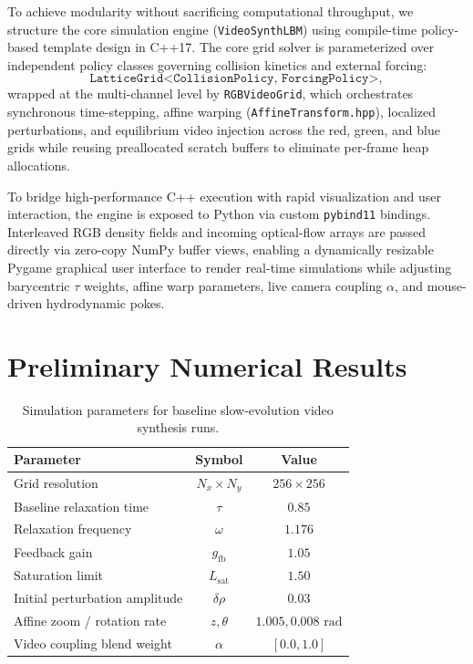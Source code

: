 \documentclass[aps,pre,twocolumn,showpacs,superscriptaddress,floatfix]{revtex4-2}
\begin{document}
To achieve modularity without sacrificing computational throughput, we structure the core simulation engine (\texttt{VideoSynthLBM}) using compile-time policy-based template design in C++17. The core grid solver is parameterized over independent policy classes governing collision kinetics and external forcing:
\begin{equation}
\texttt{LatticeGrid<CollisionPolicy, ForcingPolicy>},
\end{equation}
wrapped at the multi-channel level by \texttt{RGBVideoGrid}, which orchestrates synchronous time-stepping, affine warping (\texttt{AffineTransform.hpp}), localized perturbations, and equilibrium video injection across the red, green, and blue grids while reusing preallocated scratch buffers to eliminate per-frame heap allocations.

To bridge high-performance C++ execution with rapid visualization and user interaction, the engine is exposed to Python via custom \texttt{pybind11} bindings. Interleaved RGB density fields and incoming optical-flow arrays are passed directly via zero-copy NumPy buffer views, enabling a dynamically resizable Pygame graphical user interface to render real-time simulations while adjusting barycentric $\tau$ weights, affine warp parameters, live camera coupling $\alpha$, and mouse-driven hydrodynamic pokes.

\section{Preliminary Numerical Results}

\begin{table}[t]
\caption{Simulation parameters for baseline slow-evolution video synthesis runs.}
\label{tab:sim_params}
\begin{ruledtabular}
\begin{tabular}{lcc}
Parameter & Symbol & Value \\
\hline
Grid resolution & $N_x \times N_y$ & $256 \times 256$ \\
Baseline relaxation time & $\tau$ & $0.85$ \\
Relaxation frequency & $\omega$ & $1.176$ \\
Feedback gain & $g_{\mathrm{fb}}$ & $1.05$ \\
Saturation limit & $L_{\mathrm{sat}}$ & $1.50$ \\
Initial perturbation amplitude & $\delta \rho$ & $0.03$ \\
Affine zoom / rotation rate & $z, \theta$ & $1.005, 0.008\text{ rad}$ \\
Video coupling blend weight & $\alpha$ & $[0.0, 1.0]$ \\
\end{tabular}
\end{ruledtabular}
\end{table}
\end{document}

